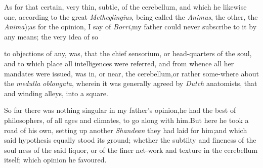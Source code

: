 \documentclass{article}
\begin{document}
As for that certain, very thin, subtle, 
of the cerebellum, and which he likewise
one, according to the great \textit{Metheglingius},
being called the \textit{Animus}, the other, the
\textit{Anima});\tsk as for the opinion, I say of
\textit{Borri},\tsk my father could never subscribe to it by any
means; the very idea of so 

\noindent
{}
to objections of any, was, that the chief sensorium, or
head-quarters of the soul, and to which place all intelligences
were referred, and from whence all her mandates were issued,\tsk
was in, or near, the\break
cerebellum,\tsk or rather some-where about
the \textit{medulla oblongata}, wherein it was ge\-nerally agreed
by \textit{Dutch} anatomists, that
 and
winding alleys, into a square.

So far there was nothing singular in my father’s
opinion,\tsk he had the best of philosophers, of all ages and
climates, to go along with him.\tsk But here he took a\break
road of his own, setting up another \textit{Shan\-dean}  they had laid for him;\tsk and which
said hypothesis equally stood its ground; whe\-ther the subtilty and
fineness of the soul  ness of
the said liquor, or of the finer net-work and texture in the
cerebellum itself; which opinion he favoured.
\end{document}
